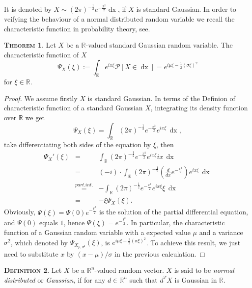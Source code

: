 \documentclass[a4paper, twoside, 11pt]{article}
\theoremstyle{definition}
\newtheorem{definition}{\scshape Definition}[section]
\newtheorem{theorem}[definition]{\scshape Theorem}
\newcommand{\sqbr}[1]{\left[ {#1} \right]}
\begin{document}
It is denoted by $X \sim (2\pi)^{-\frac{1}{2}}e^{-\frac{x^2}{2}}\mathop{dx} $, if $X$ is standard Gaussian. In order to veifying the behaviour of a normal distributed random variable we recall the characteristic function in probability theory, see\cite{bauer}. 

\begin{theorem}
  Let $X$ be a $\mathbb{R}$-valued standard Gaussian random variable. The characteristic function of $X$
\begin{equation}
  \Psi_X(\xi) := \int_\mathbb{R} e^{ix\xi}\mathcal{P}\sqbr{X \in \mathop{dx}} = e^{i\mu\xi-\frac{1}{2}(\sigma\xi)^2}
  \label{sec:cht}
\end{equation}
for $\xi \in \mathbb{R}$.
\label{sec:char}
\end{theorem}
\begin{proof}
  We assume firstly $X$ is standard Gaussian. In terms of the Definion of characteristic function of a standard Gaussian $X$, integrating its density function over $\mathbb{R}$ we get
  \begin{equation*}
	\Psi_X(\xi) = \int_\mathbb{R} (2\pi)^{-\frac{1}{2}}e^{-\frac{x^2}{2}}e^{ix\xi}\,\mathop{dx},
  \end{equation*}
take differentiating both sides of the equation by $\xi$, then
\begin{eqnarray*}
\Psi_X'(\xi) &=& \int_\mathbb{R}(2\pi)^{-\frac{1}{2}}e^{-\frac{x^2}{2}}e^{ix\xi}ix\,\mathop{dx}\\
             &=& (-i)\cdot\int_\mathbb{R} (2\pi)^{-\frac{1}{2}}(\frac{d}{dx}e^{-\frac{x^2}{2}})e^{ix\xi}\,\mathop{dx}\\
			 &\overset{part.int.}{=}& -\int_\mathbb{R}(2\pi)^{-\frac{1}{2}}e^{-\frac{x^2}{2}}e^{ix\xi}\xi\,\mathop{dx}\\
			 &=& -\xi\Psi_X(\xi).
\end{eqnarray*}
Obviously, 
$\Psi(\xi) = \Psi(0)e^{-\frac{\xi^2}{2}}$ is the solution of the partial differential equation, and $\Psi(0)$ equals $1$, hence $\Psi(\xi) = e^{-\frac{\xi^2}{2}}$.
In particular, the characteristic function of a Gaussian random variable with a expected value $\mu$ and a variance $\sigma^2$, which denoted by $\Psi_{X_{\mu,\sigma^2}}(\xi)$, is $e^{i\mu\xi-\frac{1}{2}(\sigma\xi)^2}$. To achieve this result, we just need to substitute $x$ by $(x-\mu)/\sigma$ in the previous calculation. 
\end{proof}

\begin{definition}
  Let $X$ be a $\mathbb{R}^{n}$-valued random vector. $X$ is said to be \emph{normal distributed} or \emph{Gaussian}, if for any $d \in \mathbb{R}^{n}$ such that $d^TX$ is Gaussian in $\mathbb{R}$.
  \label{sec:g1}
\end{definition}
\end{document}
